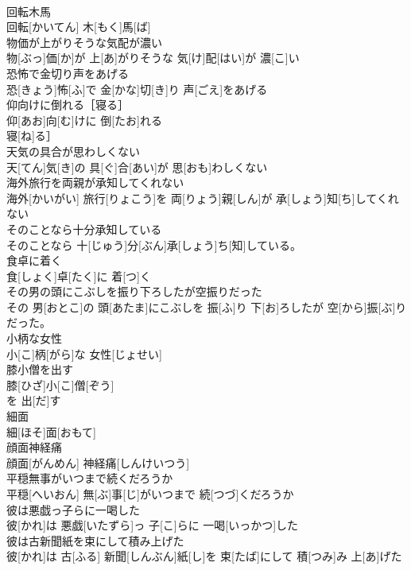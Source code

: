 \documentclass[8pt]{extreport}
\begin{document}
\begin{CJK}{UTF8}{min}
\\	回転木馬	
\\	回転[かいてん] 木[もく]馬[ば]
\\	物価が上がりそうな気配が濃い	
\\	物[ぶっ]価[か]が 上[あ]がりそうな 気[け]配[はい]が 濃[こ]い
\\	恐怖で金切り声をあげる	
\\	恐[きょう]怖[ふ]で 金[かな]切[き]り 声[ごえ]をあげる
\\	仰向けに倒れる［寝る］	
\\	仰[あお]向[む]けに 倒[たお]れる
\\	寝[ね]る］
\\	天気の具合が思わしくない	
\\	天[てん]気[き]の 具[ぐ]合[あい]が 思[おも]わしくない
\\	海外旅行を両親が承知してくれない	
\\	海外[かいがい] 旅行[りょこう]を 両[りょう]親[しん]が 承[しょう]知[ち]してくれない
\\	そのことなら十分承知している	
\\	そのことなら 十[じゅう]分[ぶん]承[しょう]ち[知]している。
\\	食卓に着く	
\\	食[しょく]卓[たく]に 着[つ]く
\\	その男の頭にこぶしを振り下ろしたが空振りだった	
\\	その 男[おとこ]の 頭[あたま]にこぶしを 振[ふ]り 下[お]ろしたが 空[から]振[ぶ]りだった。
\\	小柄な女性	
\\	小[こ]柄[がら]な 女性[じょせい]
\\	膝小僧を出す	
\\	膝[ひざ]小[こ]僧[ぞう]
\\	を 出[だ]す 
\\	細面	
\\	細[ほそ]面[おもて]
\\	顔面神経痛	
\\	顔面[がんめん] 神経痛[しんけいつう]
\\	平穏無事がいつまで続くだろうか	
\\	平穏[へいおん] 無[ぶ]事[じ]がいつまで 続[つづ]くだろうか
\\	彼は悪戯っ子らに一喝した	
\\	彼[かれ]は 悪戯[いたずら]っ 子[こ]らに 一喝[いっかつ]した
\\	彼は古新聞紙を束にして積み上げた	
\\	彼[かれ]は 古[ふる] 新聞[しんぶん]紙[し]を 束[たば]にして 積[つみ]み 上[あ]げた

\end{CJK}
\end{document}
